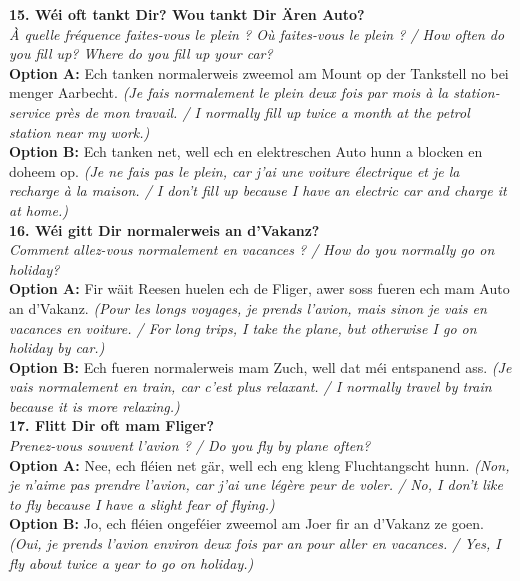 \noindent\textbf{15. Wéi oft tankt Dir? Wou tankt Dir Ären Auto?}\\
\textit{À quelle fréquence faites-vous le plein ? Où faites-vous le plein ? / How often do you fill up? Where do you fill up your car?}\\
\textbf{Option A:} Ech tanken normalerweis zweemol am Mount op der Tankstell no bei menger Aarbecht. \textit{(Je fais normalement le plein deux fois par mois à la station-service près de mon travail. / I normally fill up twice a month at the petrol station near my work.)}\\
\textbf{Option B:} Ech tanken net, well ech en elektreschen Auto hunn a blocken en doheem op. \textit{(Je ne fais pas le plein, car j'ai une voiture électrique et je la recharge à la maison. / I don't fill up because I have an electric car and charge it at home.)}\\[1em]

\noindent\textbf{16. Wéi gitt Dir normalerweis an d'Vakanz?}\\
\textit{Comment allez-vous normalement en vacances ? / How do you normally go on holiday?}\\
\textbf{Option A:} Fir wäit Reesen huelen ech de Fliger, awer soss fueren ech mam Auto an d'Vakanz. \textit{(Pour les longs voyages, je prends l'avion, mais sinon je vais en vacances en voiture. / For long trips, I take the plane, but otherwise I go on holiday by car.)}\\
\textbf{Option B:} Ech fueren normalerweis mam Zuch, well dat méi entspanend ass. \textit{(Je vais normalement en train, car c'est plus relaxant. / I normally travel by train because it is more relaxing.)}\\[1em]

\noindent\textbf{17. Flitt Dir oft mam Fliger?}\\
\textit{Prenez-vous souvent l'avion ? / Do you fly by plane often?}\\
\textbf{Option A:} Nee, ech fléien net gär, well ech eng kleng Fluchtangscht hunn. \textit{(Non, je n'aime pas prendre l'avion, car j'ai une légère peur de voler. / No, I don't like to fly because I have a slight fear of flying.)}\\
\textbf{Option B:} Jo, ech fléien ongeféier zweemol am Joer fir an d'Vakanz ze goen. \textit{(Oui, je prends l'avion environ deux fois par an pour aller en vacances. / Yes, I fly about twice a year to go on holiday.)}\\[1em]

